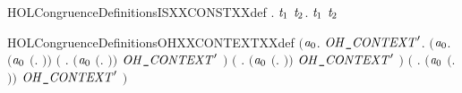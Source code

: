 \newcommand{\HOLCongruenceDefinitionsGSEQXXdef}{\UseVerbatim{HOLCongruenceDefinitionsGSEQXXdef}}
\begin{SaveVerbatim}{HOLCongruenceDefinitionsISXXCONSTXXdef}
\HOLTokenTurnstile{} \HOLSymConst{\HOLTokenForall{}}.   \HOLSymConst{\HOLTokenEquiv{}} \HOLSymConst{\HOLTokenForall{}}\ensuremath{\HOLBoundVar{t}\sb{\mathrm{1}}} \ensuremath{\HOLBoundVar{t}\sb{\mathrm{2}}}.  \ensuremath{\HOLBoundVar{t}\sb{\mathrm{1}}} \HOLSymConst{\ensuremath{=}}  \ensuremath{\HOLBoundVar{t}\sb{\mathrm{2}}}
\end{SaveVerbatim}
\newcommand{\HOLCongruenceDefinitionsISXXCONSTXXdef}{\UseVerbatim{HOLCongruenceDefinitionsISXXCONSTXXdef}}
\begin{SaveVerbatim}{HOLCongruenceDefinitionsOHXXCONTEXTXXdef}
\HOLTokenTurnstile{}  \HOLSymConst{\ensuremath{=}}
   \ensuremath{(}\HOLTokenLambda{}\ensuremath{\HOLBoundVar{a}\sb{\mathrm{0}}}.
        \HOLSymConst{\HOLTokenForall{}}\ensuremath{\HOLBoundVar{OH\HOLTokenUnderscore{}CONTEXT}\sp{\prime}}.
            \ensuremath{(}\HOLSymConst{\HOLTokenForall{}}\ensuremath{\HOLBoundVar{a}\sb{\mathrm{0}}}.
                 \ensuremath{(}\ensuremath{\HOLBoundVar{a}\sb{\mathrm{0}}} \HOLSymConst{\ensuremath{=}} \ensuremath{(}\HOLTokenLambda{}. \ensuremath{)}\ensuremath{)} \HOLSymConst{\HOLTokenDisj{}}
                 \ensuremath{(}\HOLSymConst{\HOLTokenExists{}} . \ensuremath{(}\ensuremath{\HOLBoundVar{a}\sb{\mathrm{0}}} \HOLSymConst{\ensuremath{=}} \ensuremath{(}\HOLTokenLambda{}. \HOLSymConst{\ensuremath{\ldotp}} \ensuremath{)}\ensuremath{)} \HOLSymConst{\HOLTokenConj{}} \ensuremath{\HOLBoundVar{OH\HOLTokenUnderscore{}CONTEXT}\sp{\prime}} \ensuremath{)} \HOLSymConst{\HOLTokenDisj{}}
                 \ensuremath{(}\HOLSymConst{\HOLTokenExists{}} . \ensuremath{(}\ensuremath{\HOLBoundVar{a}\sb{\mathrm{0}}} \HOLSymConst{\ensuremath{=}} \ensuremath{(}\HOLTokenLambda{}.   \HOLSymConst{\ensuremath{+}} \ensuremath{)}\ensuremath{)} \HOLSymConst{\HOLTokenConj{}} \ensuremath{\HOLBoundVar{OH\HOLTokenUnderscore{}CONTEXT}\sp{\prime}} \ensuremath{)} \HOLSymConst{\HOLTokenDisj{}}
                 \ensuremath{(}\HOLSymConst{\HOLTokenExists{}} . \ensuremath{(}\ensuremath{\HOLBoundVar{a}\sb{\mathrm{0}}} \HOLSymConst{\ensuremath{=}} \ensuremath{(}\HOLTokenLambda{}.  \HOLSymConst{\ensuremath{+}}  \ensuremath{)}\ensuremath{)} \HOLSymConst{\HOLTokenConj{}} \ensuremath{\HOLBoundVar{OH\HOLTokenUnderscore{}CONTEXT}\sp{\prime}} \ensuremath{)} \HOLSymConst{\HOLTokenDisj{}}

\end{SaveVerbatim}
